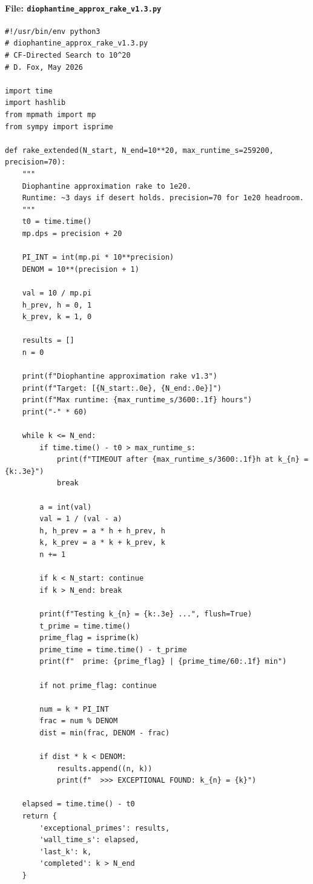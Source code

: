 \documentclass[11pt,a4paper]{article}
\begin{document}
\paragraph{File: \texttt{diophantine\_approx\_rake\_v1.3.py}}
\begin{lstlisting}
#!/usr/bin/env python3
# diophantine_approx_rake_v1.3.py
# CF-Directed Search to 10^20
# D. Fox, May 2026

import time
import hashlib
from mpmath import mp
from sympy import isprime

def rake_extended(N_start, N_end=10**20, max_runtime_s=259200, precision=70):
    """
    Diophantine approximation rake to 1e20.
    Runtime: ~3 days if desert holds. precision=70 for 1e20 headroom.
    """
    t0 = time.time()
    mp.dps = precision + 20

    PI_INT = int(mp.pi * 10**precision)
    DENOM = 10**(precision + 1)

    val = 10 / mp.pi
    h_prev, h = 0, 1
    k_prev, k = 1, 0

    results = []
    n = 0

    print(f"Diophantine approximation rake v1.3")
    print(f"Target: [{N_start:.0e}, {N_end:.0e}]")
    print(f"Max runtime: {max_runtime_s/3600:.1f} hours")
    print("-" * 60)

    while k <= N_end:
        if time.time() - t0 > max_runtime_s:
            print(f"TIMEOUT after {max_runtime_s/3600:.1f}h at k_{n} = {k:.3e}")
            break

        a = int(val)
        val = 1 / (val - a)
        h, h_prev = a * h + h_prev, h
        k, k_prev = a * k + k_prev, k
        n += 1

        if k < N_start: continue
        if k > N_end: break

        print(f"Testing k_{n} = {k:.3e} ...", flush=True)
        t_prime = time.time()
        prime_flag = isprime(k)
        prime_time = time.time() - t_prime
        print(f"  prime: {prime_flag} | {prime_time/60:.1f} min")

        if not prime_flag: continue

        num = k * PI_INT
        frac = num % DENOM
        dist = min(frac, DENOM - frac)

        if dist * k < DENOM:
            results.append((n, k))
            print(f"  >>> EXCEPTIONAL FOUND: k_{n} = {k}")

    elapsed = time.time() - t0
    return {
        'exceptional_primes': results,
        'wall_time_s': elapsed,
        'last_k': k,
        'completed': k > N_end
    }


\end{lstlisting}
\end{document}
